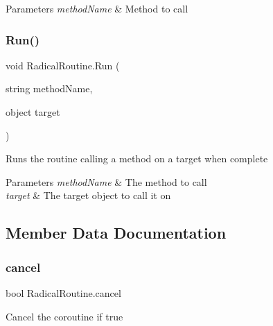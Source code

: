 \begin{DoxyParams}{Parameters}
{\em method\+Name} & Method to call \\
\hline
\end{DoxyParams}
\mbox{\label{class_radical_routine_ab638af87a31b27630da41523771ea764}} 
\subsubsection{\texorpdfstring{Run()}{Run()}\hspace{0.1cm}{\footnotesize\ttfamily [6/6]}}
{\footnotesize\ttfamily void Radical\+Routine.\+Run (\begin{DoxyParamCaption}\item[{string}]{method\+Name,  }\item[{object}]{target }\end{DoxyParamCaption})\hspace{0.3cm}{\ttfamily [inline]}}



Runs the routine calling a method on a target when complete 


\begin{DoxyParams}{Parameters}
{\em method\+Name} & The method to call \\
\hline
{\em target} & The target object to call it on \\
\hline
\end{DoxyParams}


\subsection{Member Data Documentation}
\mbox{\label{class_radical_routine_a6df3c3e067bcfb939c9d1b6c0e08cc9c}} 
\subsubsection{\texorpdfstring{cancel}{cancel}}
{\footnotesize\ttfamily bool Radical\+Routine.\+cancel}



Cancel the coroutine if true 

\mbox{\label{class_radical_routine_a001dcc418773639592a9a4e1671c4e9d}} 
